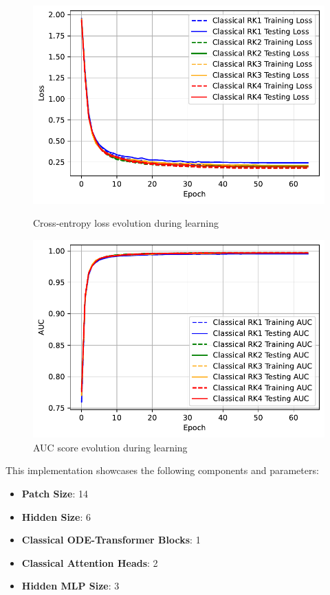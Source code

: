 \documentclass[12pt,a4paper]{report}
\begin{document}
\begin{figure}[th]
  \centering
  \includegraphics[scale=0.88]{./pics/new_pdf_graphs/classical/3_enc_1_rk_1_dec/classical_transfomer_loss_mnist_rk1_rk2_rk3_rk4.pdf}
  \caption[Cross-entropy loss evolution during learning]{Cross-entropy loss evolution during learning}
  \label{fig:p15}
  \vspace*{\floatsep}
  \centering
  \includegraphics[scale=0.88]{./pics/new_pdf_graphs/classical/3_enc_1_rk_1_dec/classical_transfomer_auc_mnist_rk1_rk2_rk3_rk4.pdf}
  \caption[AUC score evolution during learning]{AUC score evolution during learning}
  \label{fig:p16}
\end{figure}

This implementation showcases the following components and parameters:
\begin{itemize}
  \item \textbf{Patch Size}: 14
  \item \textbf{Hidden Size}: 6
  \item \textbf{Classical ODE-Transformer Blocks}: 1
  \item \textbf{Classical Attention Heads}: 2
  \item \textbf{Hidden MLP Size}: 3
\end{itemize}
\end{document}
